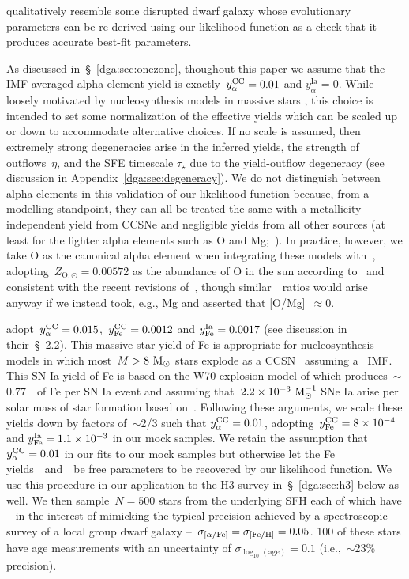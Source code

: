 qualitatively resemble some disrupted dwarf galaxy whose evolutionary
parameters can be re-derived using our likelihood function as a check that it
produces accurate best-fit parameters.
\par
As discussed in~\S~\ref{dga:sec:onezone}, thoughout this paper we assume that the
IMF-averaged alpha element yield is exactly~$y_\alpha^\text{CC} = 0.01$ and
$y_\alpha^\text{Ia} = 0$.
While loosely motivated by nucleosynthesis models in massive stars
\citep[e.g.,][]{Nomoto2013, Sukhbold2016, Limongi2018}, this choice is intended
to set some normalization of the effective yields which can be scaled up or
down to accommodate alternative choices.
If no scale is assumed, then extremely strong degeneracies arise in the
inferred yields, the strength of outflows~$\eta$, and the SFE timescale
$\tau_\star$ due to the yield-outflow degeneracy (see discussion in
Appendix~\ref{dga:sec:degeneracy}).
We do not distinguish between alpha elements in this validation of our
likelihood function because, from a modelling standpoint, they can all be
treated the same with a metallicity-independent yield from CCSNe and negligible
yields from all other sources (at least for the lighter alpha elements such as
O and Mg;~\citealp{Johnson2019}).
In practice, however, we take O as the canonical alpha element when integrating
these models with~\vice, adopting~$Z_{\text{O},\odot} = 0.00572$ as the
abundance of O in the sun according to~\citet{Asplund2009} and consistent with
the recent revisions of~\citet*{Asplund2021}, though similar~\afe~ratios would
arise anyway if we instead took, e.g., Mg and asserted that [O/Mg]~$\approx 0$.
\par
\citet{Weinberg2017b} adopt~$y_\alpha^\text{CC} = 0.015$,~$y_\text{Fe}^\text{CC} = 0.0012$ and
$y_\text{Fe}^\text{Ia} = 0.0017$ (see discussion in their~\S~2.2).
This massive star yield of Fe is appropriate for nucleosynthesis models in
which most~$M > 8~\text{M}_\odot$ stars explode as a CCSN~\citep[e.g.,][]{Woosley1995,
Chieffi2004, Chieffi2013, Nomoto2013} assuming a~\citet{Kroupa2001} IMF.
This SN Ia yield of Fe is based on the W70 explosion model of
\citet{Iwamoto1999} which produces~$\sim$0.77~\msun~of Fe per SN Ia event and
assuming that~$2.2\times10^{-3}~\text{M}_\odot^{-1}$ SNe Ia arise per solar mass of
star formation based on~\citet{Maoz2012a}.
Following these arguments, we scale these yields down by factors of~$\sim$2/3
such that $y_\alpha^\text{CC} = 0.01$, adopting~$y_\text{Fe}^\text{CC} = 8\times10^{-4}$ and
$y_\text{Fe}^\text{Ia} = 1.1\times10^{-3}$ in our mock samples.
We retain the assumption that~$y_\alpha^\text{CC} = 0.01$ in our fits to our mock samples
but otherwise let the Fe yields~\yfecc~and~\yfeia~be free parameters to be
recovered by our likelihood function.
We use this procedure in our application to the H3 survey in~\S~\ref{dga:sec:h3}
below as well.
We then sample~$N = 500$ stars from the underlying SFH each of which have -- in
the interest of mimicking the typical precision achieved by a spectroscopic
survey of a local group dwarf galaxy --~$\sigma_{\text{[$\alpha$/Fe]}} = \sigma_{\text{[Fe/H]}} = 0.05$.
100 of these stars have age measurements with an uncertainty of
$\sigma_{\log_{10}(\text{age})} = 0.1$ (i.e.,~$\sim$23\% precision).

